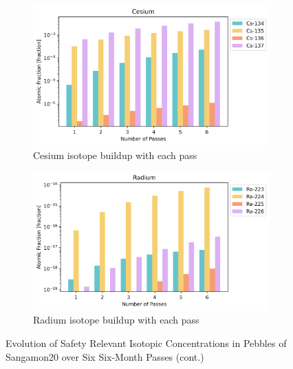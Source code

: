 \begin{figure}[H]\ContinuedFloat
\centering

\begin{subfigure}{0.95\textwidth}
  \includegraphics[width=\linewidth]{figures/compositions/caesium}
  \caption{Cesium isotope buildup with each pass}
  \label{fig:cs}
\end{subfigure}%


\begin{subfigure}{0.95\textwidth}
  \includegraphics[width=\linewidth]{figures/compositions/radium}
  \caption{Radium isotope buildup with each pass}
  \label{fig:ra}
\end{subfigure}%

\caption{Evolution of Safety Relevant Isotopic Concentrations in Pebbles of Sangamon20 over Six Six-Month Passes (cont.)}
\end{figure}

